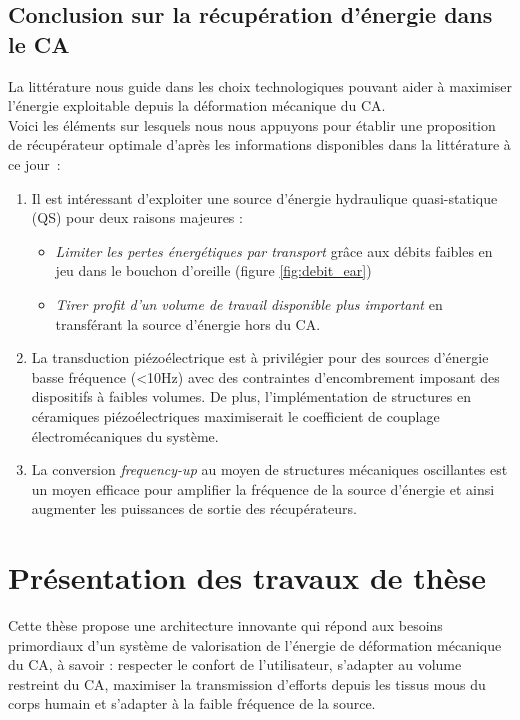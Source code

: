 	\subsection{Conclusion sur la récupération d'énergie dans le CA}
	\label{subsec:1.4.4_onclusion sur la recuperation d energie dans le CA}
La littérature nous guide dans les choix technologiques pouvant aider à maximiser l'énergie exploitable depuis la déformation mécanique du CA.\\
Voici les éléments sur lesquels nous nous appuyons pour établir une proposition de récupérateur optimale d'après les informations disponibles dans la littérature à ce jour :
\begin{enumerate}
\item %
Il est intéressant d'exploiter une source d'énergie hydraulique quasi-statique (QS) pour deux raisons majeures : 
\begin{itemize}[label=$\circ$]
	\item \emph{Limiter les pertes énergétiques par transport} grâce aux débits faibles en jeu dans le bouchon d'oreille (figure \ref{fig:debit_ear})
		\item \emph{Tirer profit d'un volume de travail disponible plus important} en transférant la source d'énergie hors du CA.
\end{itemize}	
\item %
La transduction piézoélectrique est à privilégier pour des sources d'énergie basse fréquence (<10Hz) avec des contraintes d'encombrement imposant des dispositifs à faibles volumes. De plus, l'implémentation de structures en céramiques piézoélectriques maximiserait le coefficient de couplage électromécaniques du système.
\item %
La conversion \emph{frequency-up} au moyen de structures mécaniques oscillantes est un moyen efficace pour amplifier la fréquence de la source d'énergie et ainsi augmenter les puissances de sortie des récupérateurs.
\end{enumerate}	  
\section{Présentation des travaux de thèse}
\label{sec:1.5}
Cette thèse propose une architecture innovante qui répond aux besoins primordiaux d'un système de valorisation de l'énergie de déformation mécanique du CA, à savoir : respecter le confort de l'utilisateur, s'adapter au volume restreint du CA, maximiser la transmission d'efforts depuis les tissus mous du corps humain et s'adapter à la faible fréquence de la source.

